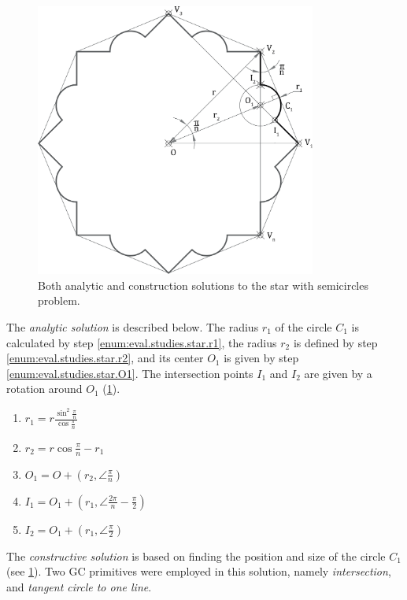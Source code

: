 \begin{figure}[htb]
  \centering
  \includegraphics[height=9cm]{fig/star-solution}
  \caption[Star with semicircles problem solution]{ Both analytic and
    construction solutions to the star with semicircles problem.}%
  \label{fig:eval.studies.star.sol}
\end{figure}

The \textit{analytic solution} is described below.  The radius $r_1$ of the
circle $C_1$ is calculated by step \ref{enum:eval.studies.star.r1}, the radius
$r_2$ is defined by step \ref{enum:eval.studies.star.r2}, and its center $O_1$
is given by step \ref{enum:eval.studies.star.O1}.  The intersection points $I_1$
and $I_2$ are given by a rotation around $O_1$
(\cref{fig:eval.studies.star.sol}).

\begin{enumerate}
  \item $r_1 = r\frac{\sin^2\frac{\pi}{n}}{\cos\frac{\pi}{n}}$%
  \label{enum:eval.studies.star.r1}
  \item $r_2 = r\cos\frac{\pi}{n} - r_1$%
  \label{enum:eval.studies.star.r2}
  \item $O_1 = O + \left(r_2, \angle\frac{\pi}{n}\right)$%
  \label{enum:eval.studies.star.O1}
  \item $I_1 = O_1 + \left(r_1, \angle\frac{2\pi}{n} - \frac{\pi}{2}\right)$
  \item $I_2 = O_1 + \left(r_1, \angle\frac{\pi}{2}\right)$
\end{enumerate}

The \textit{constructive solution} is based on finding the position and size of
the circle $C_1$ (see \cref{fig:eval.studies.star.sol}).  Two \ac{GC}
primitives were employed in this solution, namely \textit{intersection}, and
\textit{tangent circle to one line}.

